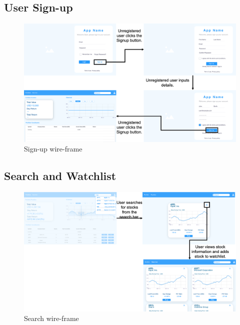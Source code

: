 \subsection{User Sign-up}
\begin{figure}[h]
    \centering
    \includegraphics[scale = 0.5]{./3_story_boards/Signup.png}
    \caption{Sign-up wire-frame}
    \label{fig:signup}
\end{figure}
\break


\subsection{Search and Watchlist}
\begin{figure}[h]
    \centering
    \includegraphics[scale = 0.5]{./3_story_boards/Search.png}
    \caption{Search wire-frame}
    \label{fig:search}
\end{figure}
\break


